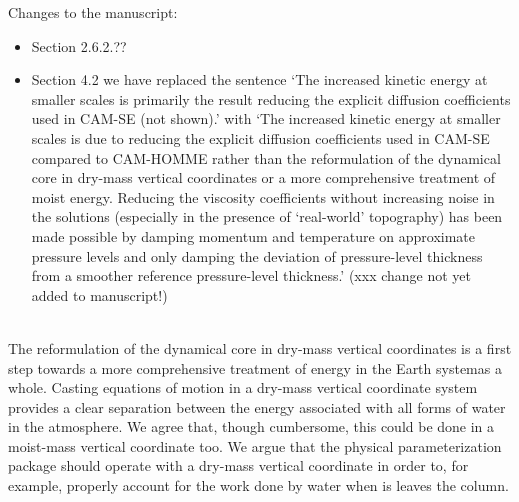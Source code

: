 \documentclass[11pt]{article}
\begin{document}
Changes to the manuscript: 
\begin{itemize}
\item Section 2.6.2.??
\item Section 4.2 we have replaced the sentence `The increased kinetic energy at smaller scales is primarily the result reducing the explicit diffusion coefficients used in CAM-SE (not shown).' with `The increased kinetic energy at smaller scales is due to reducing the explicit diffusion coefficients used in CAM-SE compared to CAM-HOMME rather than the reformulation of the dynamical core in dry-mass vertical coordinates or a more comprehensive treatment of moist energy. Reducing the viscosity coefficients without increasing noise in the solutions (especially in the presence of `real-world' topography) has been made possible by damping momentum and temperature on approximate pressure levels and only damping the deviation of pressure-level thickness from a smoother reference pressure-level thickness.' (xxx change not yet added to manuscript!)
\end{itemize}

{\color{red}{
While interesting from a design standpoint, I am not convinced that the change from moist-mass to a dry-mass vertical coordinate represents an improvement to the model, despite the great effort that would be required for this change, inside and outside of the core. The main justification given is that it makes a number of parts of the model ``easier'', although it is not clear that this is the case. While it may eliminate the need to rescale tracer masses, now the mass effect of water vapor and the condensates needs to be explicitly added in when computing the pressure-gradient force, among other considerations. It is also mentioned in Section 4.2 that many parts of the physics would need to be re-written to work with dry mass; most notably, the use of dry mass leads to the inequality of the hydrostatic assumption in (47), which is a very common assumption in models (presumably more common than the assumption that pressure surfaces do not change). }}\\

The reformulation of the dynamical core in dry-mass vertical coordinates is a first step towards a more comprehensive treatment of energy in the Earth systemas a whole. Casting equations of motion in a dry-mass vertical coordinate system provides a clear separation between the energy associated with all forms of water in the atmosphere. We agree that, though cumbersome, this could be done in a moist-mass vertical coordinate too. We argue that the physical parameterization package should operate with a dry-mass vertical coordinate in order to, for example, properly account for the work done by water when is leaves the column.\\
\end{document}

